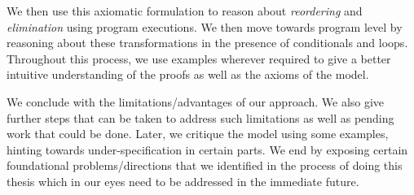 We then use this axiomatic formulation to reason about \textit{reordering} and \textit{elimination} using program executions.
We then move towards program level by reasoning about these transformations in the presence of conditionals and loops. 
Throughout this process, we use examples wherever required to give a better intuitive understanding of the proofs as well as the axioms of the model. 
    
We conclude with the limitations/advantages of our approach.
We also give further steps that can be taken to address such limitations as well as pending work that could be done.
Later, we critique the model using some examples, hinting towards under-specification in certain parts.
We end by exposing certain foundational problems/directions that we identified in the process of doing this thesis which in our eyes need to be addressed in the immediate future.

